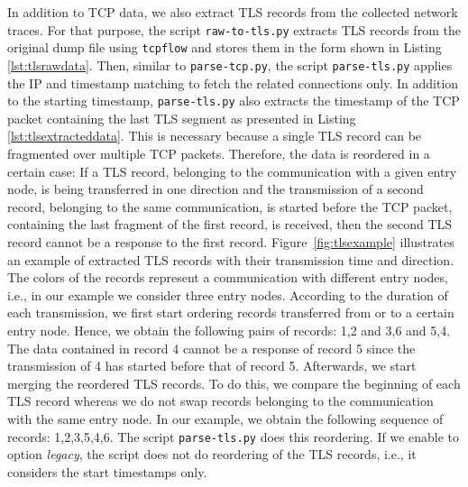 In addition to \ac{TCP} data, we also extract \ac{TLS} records from the collected network traces. For that purpose, the script \texttt{raw-to-tls.py} extracts \ac{TLS} records from the original dump file using \texttt{tcpflow} and stores them in the form shown in Listing \ref{lst:tlsrawdata}. Then, similar to \texttt{parse-tcp.py}, the script \texttt{parse-tls.py} applies the \ac{IP} and timestamp matching to fetch the related connections only. In addition to the starting timestamp, \texttt{parse-tls.py} also extracts the timestamp of the \ac{TCP} packet containing the last \ac{TLS} segment as presented in Listing \ref{lst:tlsextracteddata}. This is necessary because a single \ac{TLS} record can be fragmented over multiple \ac{TCP} packets. Therefore, the data is reordered in a certain case: If a \ac{TLS} record, belonging to the communication with a given entry node, is being transferred in one direction and the transmission of a second record, belonging to the same communication, is started before the \ac{TCP} packet, containing the last fragment of the first record, is received, then the second \ac{TLS} record cannot be a response to the first record. %
Figure~\ref{fig:tlsexample} illustrates an example of extracted \ac{TLS} records with their transmission time and direction. The colors of the records represent a communication with different entry nodes, i.e., in our example we consider three entry nodes. According to the duration of each transmission, we first start ordering records transferred from or to a certain entry node. Hence, we obtain the following pairs of records: 1,2 and 3,6 and 5,4. The data contained in record 4 cannot be a response of record 5 since the transmission of 4 has started before that of record 5. Afterwards, we start merging the reordered \ac{TLS} records. To do this, we compare the beginning of each \ac{TLS} record whereas we do not swap records belonging to the communication with the same entry node. In our example, we obtain the following sequence of records: 1,2,3,5,4,6. The script \texttt{parse-tls.py} does this reordering. If we enable to option \emph{legacy}, the script does not do reordering of the \ac{TLS} records, i.e., it considers the start timestamps only. 


